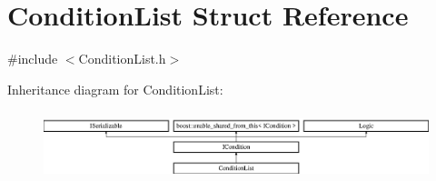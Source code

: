 \hypertarget{struct_condition_list}{}\section{Condition\+List Struct Reference}
\label{struct_condition_list}


{\ttfamily \#include $<$Condition\+List.\+h$>$}

Inheritance diagram for Condition\+List\+:\begin{figure}[H]
\begin{center}
\leavevmode
\includegraphics[height=2.014389cm]{struct_condition_list}
\end{center}
\end{figure}
